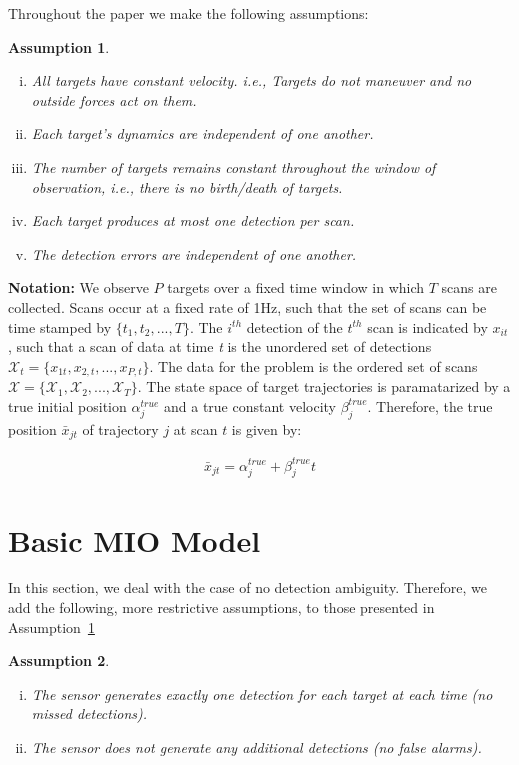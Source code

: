 \documentclass[journal]{IEEEtran}
\newtheorem{assumption}{Assumption}
\begin{document}
Throughout the paper we make the following assumptions:
\begin{assumption}\label{ass:general_assumption}
\begin{enumerate}[(i)]
\item{}All targets have constant velocity. \textit{i.e.}, Targets do not maneuver and no outside forces act on them.
\item Each target's dynamics are independent of one another.
\item The number of targets remains constant throughout the window of observation, \textit{i.e.}, there is no birth/death of targets.
\item Each target produces at most one detection per scan.
\item The detection errors are independent of one another.
\end{enumerate}
\end{assumption}

{\bf Notation:}
We observe $P$ targets over a fixed time window in which $T$ scans are collected. Scans occur at a fixed rate of 1Hz, such that the set of scans can be time stamped by $\{t_{1}, t_{2},...,T\}. $ The $i^{th}$ detection of the $t^{th}$ scan is indicated by $x_{it}$, such that a scan of data at time \textit{t} is the unordered set of detections $\mathcal{X}_{t} = \{x_{1t}, x_{2,t},...,x_{P,t}\}$. The data for the problem is the ordered set of scans $\boldsymbol{\mathcal{X}}=\{\mathcal{X}_{1},\mathcal{X}_{2},...,\mathcal{X}_{T}\}$. The state space of target trajectories is paramatarized by a true initial position $\alpha^{true}_{j}$ and a true constant velocity $\beta^{true}_{j}$. Therefore, the true position $\bar{x}_{jt}$ of trajectory $j$ at scan $t$ is given by: 

\begin{align}
	\bar{x}_{jt} = \alpha^{true}_{j} + \beta^{true}_{j}t
\end{align}

\section{Basic MIO Model}\label{sec:Basic MIO Model}
In this section, we deal with the case of no detection ambiguity. Therefore, we add the following, more restrictive assumptions, to those presented in Assumption~\ref{ass:general_assumption}
\begin{assumption}\label{ass:basic_assumptions}
\begin{enumerate}[(i)]
\item The sensor generates exactly one detection for each target at each time (no missed detections).
\item The sensor does not generate any additional detections (no false alarms).
\end{enumerate}
\end{assumption}
\end{document}
